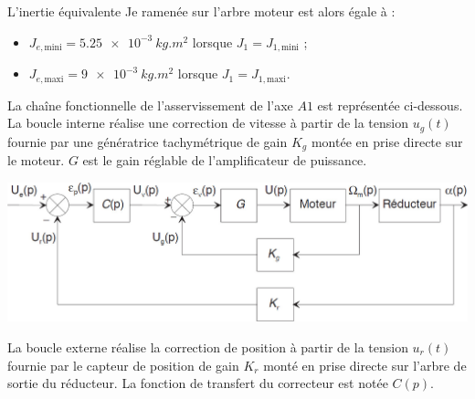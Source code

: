 \documentclass[10pt,fleqn]{article} %
\begin{document}
\begin{multicols}{2}
L’inertie équivalente Je ramenée sur l’arbre moteur est alors égale à : 
\begin{itemize}
\item $J_{e,\text{mini}} = \SI{5,25e-3}{kg.m^2}$ lorsque $J_1=J_{1,\text{mini}}$ ; 
\item $J_{e,\text{maxi}} =\SI{9e-3}{kg.m^2}$ lorsque $J_1=J_{1,\text{maxi}}$.
\end{itemize}

La chaîne fonctionnelle de l’asservissement de l’axe $A1$ est représentée ci-dessous. La boucle interne réalise une correction de vitesse à partir de la tension $u_g(t)$ fournie par une 
génératrice  tachymétrique  de  gain $K_g$ montée  en  prise  directe  sur  le moteur. $G$  est  le  gain 
réglable de l’amplificateur de puissance. 

\begin{center}
\includegraphics[width=\linewidth]{images/fig_02}

\end{center}
La boucle externe  réalise  la  correction de position à partir de  la  tension $u_r(t)$  fournie par  le 
capteur de position de gain $K_r$ monté  en prise directe  sur  l’arbre de  sortie du  réducteur. La 
fonction de transfert du correcteur est notée $C(p)$. 



\end{multicols}
\end{document}
